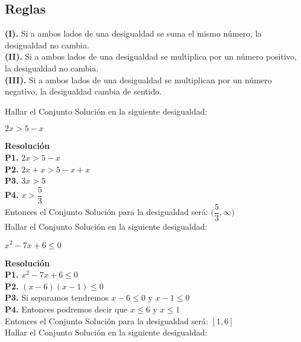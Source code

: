 \documentclass[12pt,a4paper]{book}
\newcommand*\ruleline[1]{\par\noindent\raisebox{.8ex}{\makebox[\linewidth]{\hrulefill\hspace{1ex}\raisebox{-.8ex}{#1}\hspace{1ex}\hrulefill}}}
\begin{document}
{{\subsection{Reglas}
\begin{framed}\noindent
\textbf{(I).} Si a ambos lados de una desigualdad se suma el mismo número, la desigualdad no cambia.\\${ }$\\
\textbf{(II).} Si a ambos lados de una desigualdad se multiplica por un número positivo, la desigualdad no cambia.\\${ }$\\
\textbf{(III).} Si a ambos lados de una desigualdad se multiplican por un número negativo, la desigualdad cambia de sentido.
\end{framed}
\ruleline{\textbf{Ejemplos}}
 Hallar el Conjunto Solución en la siguiente desigualdad:
\begin{center}
$2x > 5 - x$
\end{center}
\textbf{Resolución}\\${ }$\\
\textbf{P1.} $2x > 5 - x$ \\
\textbf{P2.} $2x + x > 5 - x + x$ \\
\textbf{P3.} $3x > 5 $  \\${ }$\\
\textbf{P4.} $x > \dfrac{5}{3} $ \\
Entonces el Conjunto Solución para la desigualdad será: $\bigg( \dfrac{5}{3} , \infty \bigg)$\\${ }$\\
 Hallar el Conjunto Solución en la siguiente desigualdad:
\begin{center}
$ x^2 -7x +6 \leq  0 $
\end{center}
\textbf{Resolución}\\${ }$\\
\textbf{P1.} $x^2 -7x +6 \leq 0$ \\
\textbf{P2.} $(x-6)(x-1)\leq 0$ \\
\textbf{P3.} Si separamos tendremos $ x-6\leq 0 $ y $ x-1\leq 0$ \\
\textbf{P4.} Entonces podremos decir que $x\leq 6$ y $x\leq 1$\\${ }$\\
Entonces el Conjunto Solución para la desigualdad será: $[1,6]$\\${ }$\\
 Hallar el Conjunto Solución en la siguiente desigualdad:
}}
\end{document}
